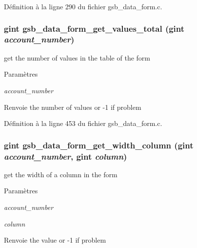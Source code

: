 Définition à la ligne 290 du fichier gsb\_\-data\_\-form.c.

\subsubsection[{gsb\_\-data\_\-form\_\-get\_\-values\_\-total}]{\setlength{\rightskip}{0pt plus 5cm}gint gsb\_\-data\_\-form\_\-get\_\-values\_\-total (gint {\em account\_\-number})}\label{gsb__data__form_8h_af78c7a67288bda5ba85257a29317fc0a}
get the number of values in the table of the form


\begin{DoxyParams}{Paramètres}
\item[{\em account\_\-number}]\end{DoxyParams}
\begin{DoxyReturn}{Renvoie}
the number of values or -\/1 if problem 
\end{DoxyReturn}


Définition à la ligne 453 du fichier gsb\_\-data\_\-form.c.

\subsubsection[{gsb\_\-data\_\-form\_\-get\_\-width\_\-column}]{\setlength{\rightskip}{0pt plus 5cm}gint gsb\_\-data\_\-form\_\-get\_\-width\_\-column (gint {\em account\_\-number}, \/  gint {\em column})}\label{gsb__data__form_8h_a7e138cf8515b9688315d67ef12c338d9}
get the width of a column in the form


\begin{DoxyParams}{Paramètres}
\item[{\em account\_\-number}]\item[{\em column}]\end{DoxyParams}
\begin{DoxyReturn}{Renvoie}
the value or -\/1 if problem 
\end{DoxyReturn}


